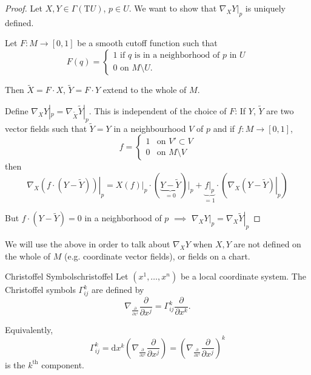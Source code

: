 \begin{proof}
    Let $X, Y \in \Gamma(\mathrm{T}U)$, $p \in U$. We want to show that $\nabla_X Y|_p$ is uniquely defined.

    Let $F: M \to [0,1]$ be a smooth cutoff function such that
    $$
    F(q)=\begin{cases}
    1 \text{ if $q$ is in a neighborhood of } p \text{ in } U \\
    0 \text{ on } M \setminus U.
    \end{cases}
    $$

    Then $\widetilde{X} = F \cdot X$, $\widetilde{Y} = F \cdot Y$ extend to the whole of $M$.

    Define $\nabla_X Y|_p = \nabla_{\widetilde{X}} \widetilde{Y}|_p$. This is independent of the choice of $F$: If $Y$, $\widetilde{Y}$ are two vector fields such that $\widetilde{Y} = Y$ in a neighbourhood $V$ of $p$ and if $f: M \to [0,1]$,
    \[
    f =
    \begin{cases}
        1 & \text{on } V' \subset V \\
        0 & \text{on } M \setminus V
    \end{cases}
    \]
    then
    $$
    \left. \nabla_X \left( f \cdot (Y - \widetilde{Y}) \right) \right|_p = \left. X(f) \right|_p \cdot (\underbrace{Y - \widetilde{Y}}_{=0}) \big|_p + \underbrace{\left. f \right|_p}_{=1} \cdot (\left. \nabla_X (Y - \widetilde{Y}) \right|_p)
    $$

    But $f \cdot (Y - \widetilde{Y}) = 0$ in a neighborhood of $p$ $\implies$ $\left. \nabla_X Y \right|_p = \left. \nabla_X \widetilde{Y} \right|_p$

\end{proof}

We will use the above in order to talk about $\nabla_X Y$ when $X, Y$ are not defined on the whole of $M$ (e.g. coordinate vector fields), or fields on a chart.

\begin{colordef}{Christoffel Symbols}{christoffel}
Let $(x^1, \ldots, x^n)$ be a local coordinate system. The Christoffel symbols $\Gamma_{ij}^k$ are defined by
\[
\nabla_{\frac{\partial}{\partial x^i}} \frac{\partial}{\partial x^j} = \Gamma_{ij}^k \frac{\partial}{\partial x^k}.
\]
\end{colordef}
Equivalently, 
$$\Gamma_{ij}^k = \mathrm{d}x^k\!\left( \nabla_{\frac{\partial}{\partial x^i}} \frac{\partial}{\partial x^j} \right) = \left(\nabla_{\frac{\partial}{\partial x^i}} \frac{\partial}{\partial x^j}\right)^k$$ 
is the $k^{\text{th}}$ component.

